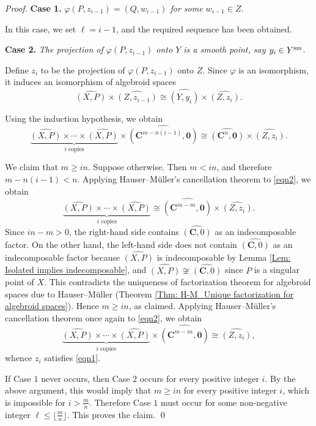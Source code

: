 \documentclass[english,10pt,reqno,twoside]{amsart}
\numberwithin{equation}{section}
\numberwithin{figure}{section}
\theoremstyle{plain}
\theoremstyle{plain}
\theoremstyle{definition}
\theoremstyle{plain}
\numberwithin{equation}{section}
\newcommand{\C}{\mathbf{C}}
\newcommand{\oo}{\mathbf{0}}
\begin{document}
\begin{proof}
\medskip

\textbf{Case 1.} \emph{$\varphi(P,z_{i-1})=(Q,w_{i-1})$ for some $w_{i-1}\in Z$.}

\smallskip

In this case, we set $\ell=i-1$, and the required sequence has been obtained.

\medskip

\textbf{Case 2.} \emph{The projection of $\varphi(P,z_{i-1})$ onto $Y$ is a smooth point, say $y_i\in Y^{\rm sm}$.}

\smallskip

Define $z_i$ to be the projection of $\varphi(P,z_{i-1})$ onto $Z$. Since $\varphi$ is an isomorphism, it induces an isomorphism of algebroid spaces
\[
\widehat{(X,P)}
\times
\widehat{(Z,z_{i-1})}
\cong
\widehat{(Y,y_i)}
\times
\widehat{(Z,z_i)}.
\]

Using the induction hypothesis, we obtain
\begin{equation}\label{eqn2}
\underbrace{\widehat{(X,P)}\times \cdots \times \widehat{(X,P)}}_{i\text{ copies}}
\times
\widehat{(\C^{m-n(i-1)},\oo)}
\cong
\widehat{(\C^n,\oo)}
\times
\widehat{(Z,z_i)}.
\end{equation}

We claim that $m\geq in$. Suppose otherwise. Then $m<in$, and therefore $m-n(i-1)<n$. Applying Hauser--M\"uller's cancellation theorem \cite[Theorem 1]{HM1990} to \eqref{eqn2}, we obtain
\[
\underbrace{\widehat{(X,P)}\times \cdots \times \widehat{(X,P)}}_{i\text{ copies}}
\cong
\widehat{(\C^{in-m},\oo)}
\times
\widehat{(Z,z_i)}.
\]
Since $in-m>0$, the right-hand side contains $\widehat{(\C,0)}$ as an indecomposable factor. On the other hand, the left-hand side does not contain $\widehat{(\C,0)}$ as an indecomposable factor because $\widehat{(X,P)}$ is indecomposable by Lemma \ref{Lem: Isolated implies indecomposable}, and $\widehat{(X,P)}\not\cong \widehat{(\C,0)}$ since $P$ is a singular point of $X$. This contradicts the uniqueness of factorization theorem for algebroid spaces due to Hauser--M\"uller (Theorem \ref{Thm: H-M_Unique factorization for algebroid spaces}). Hence $m\geq in$, as claimed. Applying Hauser--M\"uller's cancellation theorem once again to \eqref{eqn2}, we obtain
\[
\underbrace{\widehat{(X,P)}\times \cdots \times \widehat{(X,P)}}_{i\text{ copies}}
\times
\widehat{(\C^{m-in},\oo)}
\cong
\widehat{(Z,z_i)},
\]
whence $z_i$ satisfies \eqref{eqn1}.

If Case $1$ never occurs, then Case $2$ occurs for every positive integer $i$. By the above argument, this would imply that $m\geq in$ for every positive integer $i$, which is impossible for $i>\frac{m}{n}$. Therefore Case $1$ must occur for some non-negative integer $\ell\leq \lfloor \frac{m}{n}\rfloor$. This proves the claim.
\qed


\end{proof}
\end{document}
